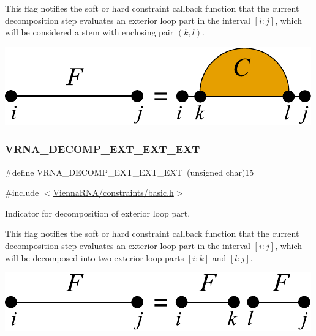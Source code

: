 This flag notifies the soft or hard constraint callback function that the current decomposition step evaluates an exterior loop part in the interval $[i:j]$, which will be considered a stem with enclosing pair $(k,l)$.

 
\begin{DoxyImageNoCaption}
  \mbox{\includegraphics[width=\textwidth,height=\textheight/2,keepaspectratio=true]{decomp_ext_stem}}
\end{DoxyImageNoCaption}
 \mbox{\label{group__constraints_ga803bd818b3f4b2b0a4a5cfa2f7dc2045}} 
\subsubsection{\texorpdfstring{VRNA\_DECOMP\_EXT\_EXT\_EXT}{VRNA\_DECOMP\_EXT\_EXT\_EXT}}
{\footnotesize\ttfamily \#define V\+R\+N\+A\+\_\+\+D\+E\+C\+O\+M\+P\+\_\+\+E\+X\+T\+\_\+\+E\+X\+T\+\_\+\+E\+XT~(unsigned char)15}



{\ttfamily \#include $<$\mbox{\hyperlink{constraints_2basic_8h}{Vienna\+R\+N\+A/constraints/basic.\+h}}$>$}



Indicator for decomposition of exterior loop part. 

This flag notifies the soft or hard constraint callback function that the current decomposition step evaluates an exterior loop part in the interval $[i:j]$, which will be decomposed into two exterior loop parts $[i:k]$ and $[l:j]$.

 
\begin{DoxyImageNoCaption}
  \mbox{\includegraphics[width=\textwidth,height=\textheight/2,keepaspectratio=true]{decomp_ext_ext_ext}}
\end{DoxyImageNoCaption}
 \mbox{\label{group__constraints_gabb09c5b78b75a44502fc77b950125c1e}} 
